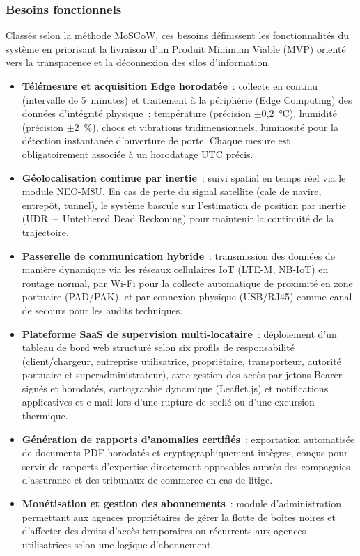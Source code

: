 \subsubsection{Besoins fonctionnels}

Classés selon la méthode MoSCoW, ces besoins définissent les fonctionnalités du système en priorisant la livraison d'un Produit Minimum Viable (MVP) orienté vers la transparence et la déconnexion des silos d'information.

\begin{itemize}
\item \textbf{Télémesure et acquisition Edge horodatée}~: collecte en continu (intervalle de 5~minutes) et traitement à la périphérie (Edge Computing) des données d'intégrité physique~: température (précision $\pm$0,2~°C), humidité (précision $\pm$2~\%), chocs et vibrations tridimensionnels, luminosité pour la détection instantanée d'ouverture de porte. Chaque mesure est obligatoirement associée à un horodatage UTC précis.
\item \textbf{Géolocalisation continue par inertie}~: suivi spatial en temps réel via le module NEO-M8U. En cas de perte du signal satellite (cale de navire, entrepôt, tunnel), le système bascule sur l'estimation de position par inertie (UDR~--~Untethered Dead Reckoning) pour maintenir la continuité de la trajectoire\cite{ublox}.
\item \textbf{Passerelle de communication hybride}~: transmission des données de manière dynamique via les réseaux cellulaires IoT (LTE-M, NB-IoT) en routage normal, par Wi-Fi pour la collecte automatique de proximité en zone portuaire (PAD/PAK), et par connexion physique (USB/RJ45) comme canal de secours pour les audits techniques.
\item \textbf{Plateforme SaaS de supervision multi-locataire}~: déploiement d'un tableau de bord web structuré selon six profils de responsabilité (client/chargeur, entreprise utilisatrice, propriétaire, transporteur, autorité portuaire et superadministrateur), avec gestion des accès par jetons Bearer signés et horodatés, cartographie dynamique (Leaflet.js) et notifications applicatives et e-mail lors d'une rupture de scellé ou d'une excursion thermique.
\end{itemize}

\begin{itemize}
\item \textbf{Génération de rapports d'anomalies certifiés}~: exportation automatisée de documents PDF horodatés et cryptographiquement intègres, conçus pour servir de rapports d'expertise directement opposables auprès des compagnies d'assurance et des tribunaux de commerce en cas de litige.
\item \textbf{Monétisation et gestion des abonnements}~: module d'administration permettant aux agences propriétaires de gérer la flotte de boîtes noires et d'affecter des droits d'accès temporaires ou récurrents aux agences utilisatrices selon une logique d'abonnement.
\end{itemize}

